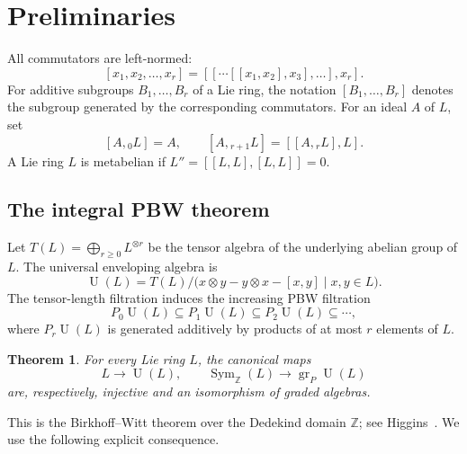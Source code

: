 \documentclass[a4paper,11pt,reqno]{amsart}
\newtheorem{theorem}{Theorem}[section]
\theoremstyle{definition}
\newcommand{\Z}{\mathbb Z}
\newcommand{\U}{\operatorname U}
\newcommand{\Sym}{\operatorname{Sym}}
\newcommand{\gr}{\operatorname{gr}}
\begin{document}
\section{Preliminaries}\label{sec:preliminaries}

All commutators are left-normed:
\[
 [x_1,x_2,\ldots,x_r]=[[\cdots[[x_1,x_2],x_3],\ldots],x_r].
\]
For additive subgroups $B_1,\ldots,B_r$ of a Lie ring, the notation
$[B_1,\ldots,B_r]$ denotes the subgroup generated by the corresponding
commutators.  For an ideal $A$ of $L$, set
\[
 [A,{}_0L]=A,
 \qquad
 [A,{}_{r+1}L]=[[A,{}_rL],L].
\]
A Lie ring $L$ is metabelian if
$L''=[[L,L],[L,L]]=0$.

\subsection{The integral PBW theorem}

Let $T(L)=\bigoplus_{r\geq0}L^{\otimes r}$ be the tensor algebra of the
underlying abelian group of $L$.  The universal enveloping algebra is
\[
 \U(L)=T(L)/\bigl(x\otimes y-y\otimes x-[x,y]\mid x,y\in L\bigr).
\]
The tensor-length filtration induces the increasing PBW filtration
\[
 P_0\U(L)\subseteq P_1\U(L)\subseteq P_2\U(L)\subseteq\cdots,
\]
where $P_r\U(L)$ is generated additively by products of at most $r$
elements of $L$.

\begin{theorem}\label{thm:PBW}
For every Lie ring $L$, the canonical maps
\[
 L\longrightarrow\U(L),
 \qquad
 \Sym_{\Z}(L)\longrightarrow\gr_P\U(L)
\]
are, respectively, injective and an isomorphism of graded algebras.
\end{theorem}

This is the Birkhoff--Witt theorem over the Dedekind domain $\Z$; see
Higgins~\cite{Higgins1969}.  We use the following explicit consequence.
\end{document}
